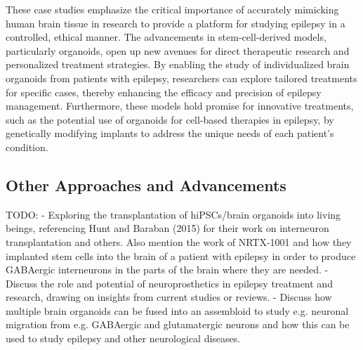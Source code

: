 \documentclass[10pt]{article}
\begin{document}
\begin{sloppypar}
  \vspace{0.5cm} %
  These case studies emphasize the critical importance of accurately mimicking human brain tissue in research to provide a platform for studying epilepsy in a controlled, ethical manner. The advancements in stem-cell-derived models, particularly organoids, open up new avenues for direct therapeutic research and personalized treatment strategies. By enabling the study of individualized brain organoids from patients with epilepsy, researchers can explore tailored treatments for specific cases, thereby enhancing the efficacy and precision of epilepsy management. Furthermore, these models hold promise for innovative treatments, such as the potential use of organoids for cell-based therapies in epilepsy, by genetically modifying implants to address the unique needs of each patient's condition.

  \subsection{Other Approaches and Advancements}
  \label{sec:other-approaches-and-advancements}

  TODO:
  - Exploring the transplantation of hiPSCs/brain organoids into living beings, referencing Hunt and Baraban (2015) for their work on interneuron transplantation and others. Also mention the work of NRTX-1001 and how they implanted stem cells into the brain of a patient with epilepsy in order to produce GABAergic interneurons in the parts of the brain where they are needed.
  - Discuss the role and potential of neuroprosthetics in epilepsy treatment and research, drawing on insights from current studies or reviews.
  - Discuss how multiple brain organoids can be fused into an assembloid to study e.g. neuronal migration from e.g. GABAergic and glutamatergic neurons and how this can be used to study epilepsy and other neurological diseases.


\end{sloppypar}
\end{document}
